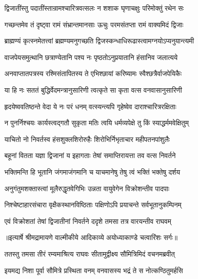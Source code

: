 \twolineshloka
{द्विजातींस्तु पदातींस्तान्रामश्चारित्रवत्सलः}
{न शशाक घृणाचक्षुः परिमोक्तुं रथेन सः} %

\twolineshloka
{गच्छन्तमेव तं दृष्ट्वा रामं संभ्रान्तमानसाः}
{ऊचुः परमसंतप्ता रामं वाक्यमिदं द्विजाः} %

\twolineshloka
{ब्राह्मण्यं कृत्स्नमेतत्त्वां ब्रह्मण्यमनुगच्छति}
{द्विजस्कन्धाधिरूढास्त्वामग्नयोऽप्यनुयान्त्यमी} %

\twolineshloka
{वाजपेयसमुत्थानि छत्राण्येतानि पश्य नः}
{पृष्ठतोऽनुप्रयातानि हंसानिव जलात्यये} %

\twolineshloka
{अनवाप्तातपत्रस्य रश्मिसंतापितस्य ते}
{एभिश्छायां करिष्यामः स्वैश्छत्रैर्वाजपेयिकैः} %

\twolineshloka
{या हि नः सततं बुद्धिर्वेदमन्त्रानुसारिणी}
{त्वत्कृते सा कृता वत्स वनवासानुसारिणी} %

\twolineshloka
{हृदयेष्ववतिष्ठन्ते वेदा ये नः परं धनम्}
{वत्स्यन्त्यपि गृहेष्वेव दाराश्चारित्ररक्षिताः} %

\twolineshloka
{न पुनर्निश्चयः कार्यस्त्वद्गतौ सुकृता मतिः}
{त्वयि धर्मव्यपेक्षे तु किं स्याद्धर्ममवेक्षितुम्} %

\twolineshloka
{याचितो नो निवर्तस्व हंसशुक्लशिरोरुहैः}
{शिरोभिर्निभृताचार महीपतनपांशुलैः} %

\twolineshloka
{बहूनां वितता यज्ञा द्विजानां य इहागताः}
{तेषां समाप्तिरायत्ता तव वत्स निवर्तने} %

\twolineshloka
{भक्तिमन्ति हि भूतानि जंगमाजंगमानि च}
{याचमानेषु तेषु त्वं भक्तिं भक्तेषु दर्शय} %

\twolineshloka
{अनुगंतुमशक्तास्त्वां मूलैरुद्धृतवेगिभिः}
{उन्नता वायुवेगेन विक्रोशन्तीव पादपाः} %

\twolineshloka
{निश्चेष्टाहारसंचारा वृक्षैकस्थानविष्ठिताः}
{पक्षिणोऽपि प्रयाचन्ते सर्वभूतानुकम्पिनम्} %

\twolineshloka
{एवं विक्रोशतां तेषां द्विजातीनां निवर्तने}
{ददृशे तमसा तत्र वारयन्तीव राघवम्} %


{॥इत्यार्षे श्रीमद्रामायणे वाल्मीकीये आदिकाव्ये अयोध्याकाण्डे चत्वारिंशः सर्गः॥}


\twolineshloka
{ततस्तु तमसा तीरं रम्यमाश्रित्य राघवः}
{सीतामुद्वीक्ष्य सौमित्रिमिदं वचनमब्रवीत्} %

\twolineshloka
{इयमद्य निशा पूर्वा सौमित्रे प्रस्थिता वनम्}
{वनवासस्य भद्रं ते स नोत्कण्ठितुमर्हसि} %

